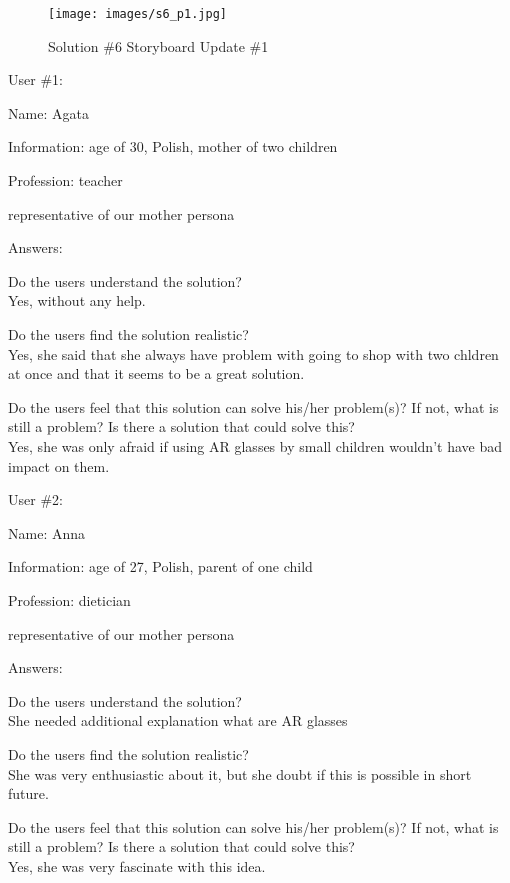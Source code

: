 \documentclass[a4paper,10pt,oneside]{scrreprt}
\begin{document}
\begin{figure}[H]
	\centering
	\texttt{[image: images/s6\_p1.jpg]}
	\caption{Solution \#6 Storyboard Update \#1}
\end{figure}

User \#1:
\begin{compactitem}
	\item Name: Agata
	\item Information: age of 30, Polish, mother of two children
	\item Profession: teacher
	\item representative of our mother persona
\end{compactitem}
\bigskip

Answers:
\begin{compactitem}
	\item Do the users understand the solution?\\
	Yes, without any help.
	
	\item Do the users find the solution realistic?\\
	Yes, she said that she always have problem with going to shop with two chldren at once and that it seems to be a great solution.
	
	\item Do the users feel that this solution can solve his/her problem(s)? If not, what is still
	a problem? Is there a solution that could solve this?\\
	Yes, she was only afraid if using AR glasses by small children wouldn't have bad impact on them.

\end{compactitem}
\bigskip

User \#2:
\begin{compactitem}
	\item Name: Anna
	\item Information: age of 27, Polish, parent of one child
	\item Profession: dietician
	\item representative of our mother persona 
\end{compactitem}
\bigskip

Answers:
\begin{compactitem}
	\item Do the users understand the solution?\\
	She needed additional explanation what are AR glasses\\
	
	\item Do the users find the solution realistic?\\
	She was very enthusiastic about it, but she doubt if this is possible in short future.\\
	
	\item Do the users feel that this solution can solve his/her problem(s)? If not, what is still
	a problem? Is there a solution that could solve this?\\
	Yes, she was very fascinate with this idea.\\
\end{compactitem}
\bigskip
\end{document}
